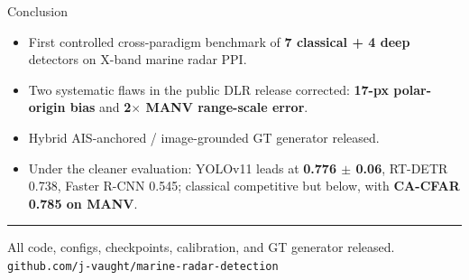 \documentclass[aspectratio=169,10pt]{beamer}
\newcommand{\hl}[1]{\textcolor{garnet}{\textbf{#1}}}
\begin{document}
\begin{frame}{Conclusion}
  \begin{itemize}\setlength\itemsep{0.55em}
    \item First controlled cross-paradigm benchmark of \hl{7 classical + 4 deep} detectors on X-band marine radar PPI.
    \item Two systematic flaws in the public DLR release corrected:
          \hl{17-px polar-origin bias} and \hl{2$\times$ MANV range-scale error}.
    \item Hybrid AIS-anchored / image-grounded GT generator released.
    \item Under the cleaner evaluation: YOLOv11 leads at \hl{0.776 $\pm$ 0.06},
          RT-DETR 0.738, Faster R-CNN 0.545; classical competitive but below, with \hl{CA-CFAR 0.785 on MANV}.
  \end{itemize}
  \vspace{0.4em}
  \begin{center}
    {\color{garnet}\rule{0.8\textwidth}{0.6pt}}\par
    \vspace{0.3em}
    \small All code, configs, checkpoints, calibration, and GT generator released.\\
    \small \texttt{github.com/j-vaught/marine-radar-detection}
  \end{center}
\end{frame}
\end{document}
